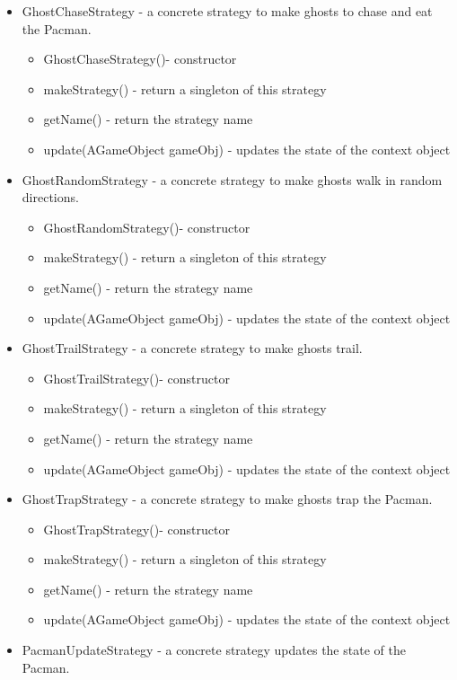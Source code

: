 \documentclass[letterpaper, 11pt]{article}
\begin{document}
\begin{itemize}
\begin{itemize}
  \end{itemize}
  \item GhostChaseStrategy - a concrete strategy to make ghosts to chase and eat the Pacman.
  \begin{itemize}
  \item GhostChaseStrategy()- constructor
  \item makeStrategy() - return a singleton of this strategy
  \item getName() - return the strategy name
  \item update(AGameObject gameObj) - updates the state of the context object
  \end{itemize}
  \item GhostRandomStrategy - a concrete strategy to make ghosts walk in random directions.
  \begin{itemize}
  \item GhostRandomStrategy()- constructor
  \item makeStrategy() - return a singleton of this strategy
  \item getName() - return the strategy name
  \item update(AGameObject gameObj) - updates the state of the context object
  \end{itemize}
   \item GhostTrailStrategy - a concrete strategy to make ghosts trail.
  \begin{itemize}
  \item GhostTrailStrategy()- constructor
  \item makeStrategy() - return a singleton of this strategy
  \item getName() - return the strategy name
  \item update(AGameObject gameObj) - updates the state of the context object
  \end{itemize}
  \item GhostTrapStrategy - a concrete strategy to make ghosts trap the Pacman.
  \begin{itemize}
  \item GhostTrapStrategy()- constructor
  \item makeStrategy() - return a singleton of this strategy
  \item getName() - return the strategy name
  \item update(AGameObject gameObj) - updates the state of the context object
  \end{itemize}
 \item PacmanUpdateStrategy - a concrete strategy updates the state of the Pacman.

\end{itemize}
\end{document}
